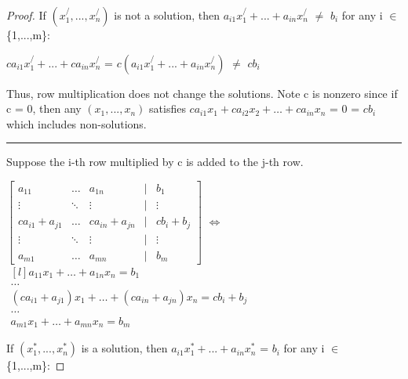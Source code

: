\begin{proof}
        \hspace{0.5cm}
        If $(x_1^/,...,x_n^/)$ is not a solution,
        then $a_{i1}x_1^/ + ... + a_{in}x_n^/$ $\not =$ $b_i$
        for any i $\in$ \{1,...,m\}:
        
        \hspace{1cm}
        $ca_{i1}x_1^/ + ... + ca_{in}x_n^/$
        = $c(a_{i1}x_1^/ + ... + a_{in}x_n^/)$
        $\not =$ $cb_i$
        

        Thus, row multiplication does not change the solutions.
        Note c is nonzero since if c = 0, then any $(x_1,...,x_n)$
        satisfies $ca_{i1}x_1 + ca_{i2}x_2 + \hdots + ca_{in}x_n$
        = 0 = $cb_i$ which includes non-solutions.

        \rule[0.1cm]{16.7cm}{0.01cm}

        Suppose the i-th row multiplied by c is added to the j-th row.

        \hspace{0.5cm}
        \footnotesize
        $\begin{bmatrix}
            a_{11} & \hdots & a_{1n} & | & b_1 \\
            \vdots & \ddots & \vdots & | & \vdots \\
            ca_{i1}+a_{j1} & \hdots & ca_{in}+a_{jn}
                & | & cb_i+b_j \\
            \vdots & \ddots & \vdots & | & \vdots \\
            a_{m1} & \hdots & a_{mn} & | & b_m
        \end{bmatrix}$
        \hspace{0.5cm}
        $\Leftrightarrow$
        \hspace{0.5cm}
        $\begin{matrix*}[l]
            a_{11}x_1 + \hdots + a_{1n}x_n = b_1 \\
            \hdots \\
            (ca_{i1}+a_{j1})x_1 + \hdots + (ca_{in}+a_{jn})x_n = cb_i+b_j  \\
            \hdots \\
            a_{m1}x_1 + \hdots + a_{mn}x_n = b_m
        \end{matrix*}$
        \normalsize

        \hspace{0.5cm}
        If $(x_1^*,...,x_n^*)$ is a solution,
        then $a_{i1}x_1^* + ... + a_{in}x_n^*$ = $b_i$
        for any i $\in$ \{1,...,m\}:
        

\end{proof}
